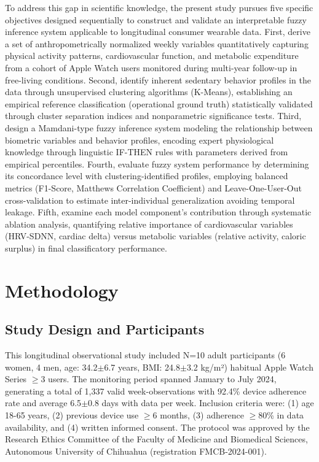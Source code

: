 \documentclass[journal,twoside,web]{ieeecolor}
\begin{document}
To address this gap in scientific knowledge, the present study pursues five specific objectives designed sequentially to construct and validate an interpretable fuzzy inference system applicable to longitudinal consumer wearable data. First, derive a set of anthropometrically normalized weekly variables quantitatively capturing physical activity patterns, cardiovascular function, and metabolic expenditure from a cohort of Apple Watch users monitored during multi-year follow-up in free-living conditions. Second, identify inherent sedentary behavior profiles in the data through unsupervised clustering algorithms (K-Means), establishing an empirical reference classification (operational ground truth) statistically validated through cluster separation indices and nonparametric significance tests. Third, design a Mamdani-type fuzzy inference system modeling the relationship between biometric variables and behavior profiles, encoding expert physiological knowledge through linguistic IF-THEN rules with parameters derived from empirical percentiles. Fourth, evaluate fuzzy system performance by determining its concordance level with clustering-identified profiles, employing balanced metrics (F1-Score, Matthews Correlation Coefficient) and Leave-One-User-Out cross-validation to estimate inter-individual generalization avoiding temporal leakage. Fifth, examine each model component's contribution through systematic ablation analysis, quantifying relative importance of cardiovascular variables (HRV-SDNN, cardiac delta) versus metabolic variables (relative activity, caloric surplus) in final classificatory performance.


\section{Methodology}

\subsection{Study Design and Participants}
This longitudinal observational study included N=10 adult participants (6 women, 4 men, age: 34.2$\pm$6.7 years, BMI: 24.8$\pm$3.2 kg/m²) habitual Apple Watch Series $\geq$3 users. The monitoring period spanned January to July 2024, generating a total of 1,337 valid week-observations with 92.4\% device adherence rate and average 6.5$\pm$0.8 days with data per week. Inclusion criteria were: (1) age 18-65 years, (2) previous device use $\geq$6 months, (3) adherence $\geq$80\% in data availability, and (4) written informed consent. The protocol was approved by the Research Ethics Committee of the Faculty of Medicine and Biomedical Sciences, Autonomous University of Chihuahua (registration FMCB-2024-001).
\end{document}
